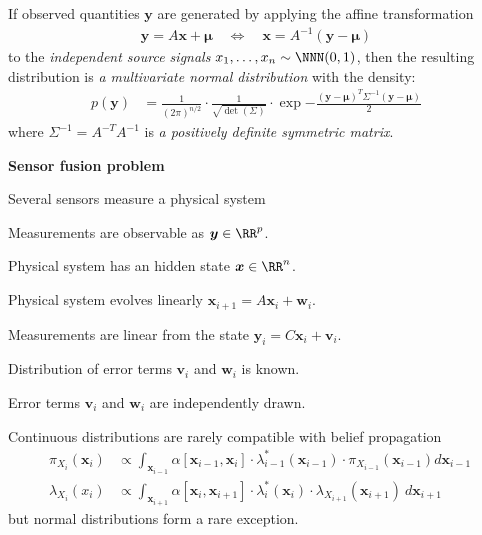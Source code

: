 \documentclass[landscape,footrule]{foils}
\renewcommand{\vec}[1]{\boldsymbol{#1}}
\begin{document}

If observed quantities $\vec{y}$ are generated by applying the affine transformation 
\begin{align*}
 \vec{y}=A\vec{x}+\vec{\mu}\quad\Leftrightarrow\quad \vec{x}=A^{-1}(\vec{y}-\vec{\mu})\enspace
\end{align*}
to the \emph{independent source signals} $x_1,\ldots, x_n\sim\NNN(0,1)$, then the resulting distribution is \emph{a multivariate normal distribution} with the density:
\begin{align*}
p(\vec{y})&=\frac{1}{(2\pi)^{n/2}}\cdot\frac{1}{\sqrt{\det(\Sigma)}}\cdot
\exp{-\frac{(\vec{y}-\vec{\mu})^T \Sigma^{-1}(\vec{y}-\vec{\mu})}{2}}\enspace
\end{align*} 
where $\Sigma^{-1}=A^{-T}A^{-1}$ is \emph{a positively definite symmetric matrix}.








\textbf{Sensor fusion problem}

\begin{triangles}
\item Several sensors measure a physical system
\item Measurements are observable as $\vec{y}\in\RR^p$.
\item Physical system has an hidden state $\vec{x}\in\RR^n$.
\item Physical system evolves linearly $\vec{x}_{i+1}=A\vec{x}_i+\vec{w}_i$.
\item Measurements are linear from the state $\vec{y}_{i}=C\vec{x}_i+\vec{v}_i$.
\item Distribution of error terms $\vec{v}_i$ and $\vec{w}_i$ is known.  
\item Error terms $\vec{v}_i$ and $\vec{w}_i$ are independently drawn.
\end{triangles}



Continuous distributions are rarely compatible with belief propagation
\begin{align*}
\pi_{X_i}(\vec{x}_i)
&\propto \int_{\vec{x}_{i-1}} \alpha[\vec{x}_{i-1}, \vec{x}_i]\cdot\lambda_{i-1}^*(\vec{x}_{i-1})\cdot \pi_{X_{i-1}}(\vec{x}_{i-1})d\vec{x}_{i-1}\\
\lambda_{X_i}(x_i)
&\propto \int_{\vec{x}_{i+1}} \alpha[\vec{x}_{i}, \vec{x}_{i+1}]\cdot\lambda_{i}^*(\vec{x}_{i})\cdot\lambda_{X_{i+1}}(\vec{x}_{i+1})\ d\vec{x}_{i+1}
\end{align*}
but normal distributions form a rare exception.
 
\end{document}
